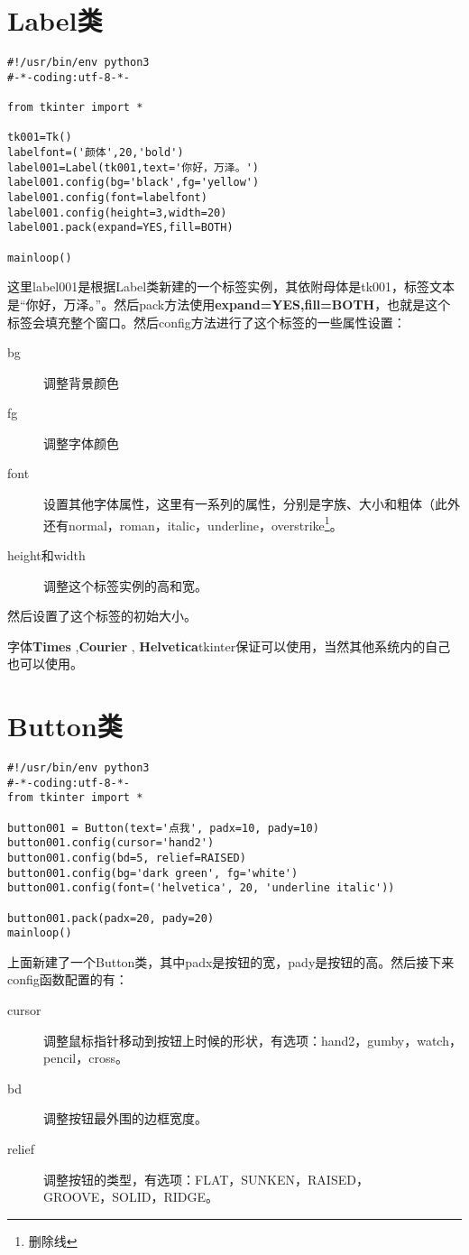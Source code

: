 \documentclass[12pt,oneside]{book}
\begin{document}
\begin{common-format}
\section{Label类}
\begin{Verbatim}
#!/usr/bin/env python3
#-*-coding:utf-8-*-

from tkinter import *

tk001=Tk()
labelfont=('颜体',20,'bold')
label001=Label(tk001,text='你好，万泽。')
label001.config(bg='black',fg='yellow')
label001.config(font=labelfont)
label001.config(height=3,width=20)
label001.pack(expand=YES,fill=BOTH)

mainloop()
\end{Verbatim}
这里label001是根据Label类新建的一个标签实例，其依附母体是tk001，标签文本是“你好，万泽。”。然后pack方法使用\textbf{expand=YES,fill=BOTH}，也就是这个标签会填充整个窗口。然后config方法进行了这个标签的一些属性设置：
\begin{description}
\item[bg] 调整背景颜色
\item[fg] 调整字体颜色
\item[font] 设置其他字体属性，这里有一系列的属性，分别是字族、大小和粗体（此外还有normal，roman，italic，underline，overstrike\footnote{删除线}。
\item[height和width] 调整这个标签实例的高和宽。
\end{description}

然后设置了这个标签的初始大小。

字体\textbf{Times} ,\textbf{Courier} ,\textbf{ Helvetica}tkinter保证可以使用，当然其他系统内的自己也可以使用。

\section{Button类}
\begin{Verbatim}
#!/usr/bin/env python3
#-*-coding:utf-8-*-
from tkinter import *

button001 = Button(text='点我', padx=10, pady=10)
button001.config(cursor='hand2')
button001.config(bd=5, relief=RAISED)
button001.config(bg='dark green', fg='white')
button001.config(font=('helvetica', 20, 'underline italic'))

button001.pack(padx=20, pady=20)
mainloop()
\end{Verbatim}
上面新建了一个Button类，其中padx是按钮的宽，pady是按钮的高。然后接下来config函数配置的有：\begin{description}
\item[cursor] 调整鼠标指针移动到按钮上时候的形状，有选项：hand2，gumby，watch，pencil，cross。
\item[bd] 调整按钮最外围的边框宽度。
\item[relief] 调整按钮的类型，有选项：FLAT，SUNKEN，RAISED，\\GROOVE，SOLID，RIDGE。 
\end{description}




\end{common-format}
\end{document}
